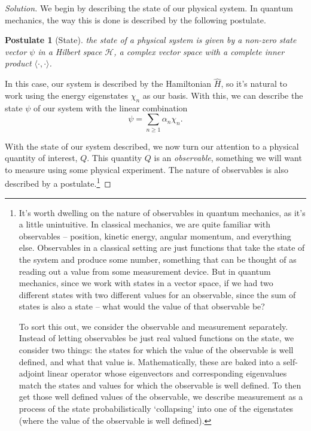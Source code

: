 \documentclass[a4paper]{scrartcl}
\newtheorem*{postulate}{Postulate}
\begin{document}
\begin{proof}[Solution]
    We begin by describing the state of our physical system. In quantum mechanics, the way this is done is described by the following postulate.
    
    \begin{postulate}[State]
        the state of a physical system is given by a non-zero \emph{state vector} $\psi$ in a \emph{Hilbert space} $\mathcal{H}$, a complex vector space with a complete inner product $\langle \cdot, \cdot \rangle$.
    \end{postulate}

    In this case, our system is described by the Hamiltonian $\hat{H}$, so it's natural to work using the energy eigenstates $\chi_n$ as our basis.
    With this, we can describe the state $\psi$ of our system with the linear combination
    $$
    \psi = \sum_{n \geq 1} \alpha_n \chi_n.
    $$

    With the state of our system described, we now turn our attention to a physical quantity of interest, $Q$. This quantity $Q$ is an \emph{observable}, something we will want to measure using some physical experiment.
    The nature of observables is also described by a postulate.\footnote{It's worth dwelling on the nature of observables in quantum mechanics, as it's a little unintuitive. In classical mechanics, we are quite familiar with observables -- position, kinetic energy, angular momentum, and everything else. Observables in a classical setting are just functions that take the state of the system and produce some number, something that can be thought of as reading out a value from some measurement device.
    But in quantum mechanics, since we work with states in a vector space, if we had two different states with two different values for an observable, since the sum of states is also a state -- what would the value of that observable be? 
    
    To sort this out, we consider the observable and measurement separately.
    Instead of letting observables be just real valued functions on the state, we consider two things: the states for which the value of the observable is well defined, and what that value is. Mathematically, these are baked into a self-adjoint linear operator whose eigenvectors and corresponding eigenvalues match the states and values for which the observable is well defined. To then get those well defined values of the observable, we describe measurement as a process of the state probabilistically `collapsing' into one of the eigenstates (where the value of the observable is well defined).}


\end{proof}
\end{document}
